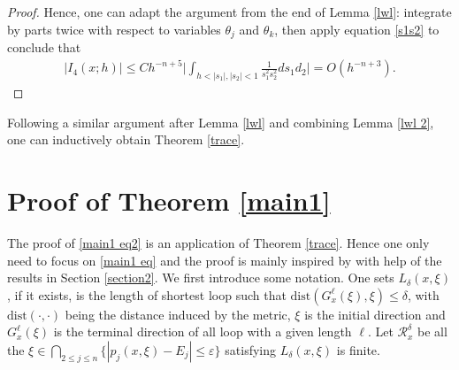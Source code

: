 \documentclass[12pt,reqno]{amsart}
\renewcommand{\epsilon}{\varepsilon}
\numberwithin{equation}{section}
\begin{document}
\begin{proof}
Hence, one can adapt the argument from the end of Lemma \ref{lwl}: integrate by parts twice with respect to variables $\theta_j$ and $\theta_k$, then apply equation \eqref{s1s2} to conclude that
\begin{align}\label{last2'}
\Big| {I}_4 (x; h) \Big| \leq C h^{-n+5}  \Big|\int_{h<|s_1|,|s_2|<1}\frac{1}{s^2_1 s^2_2}  ds_1 d_2 \Big|=O(h^{-n+3}) .
\end{align}



\end{proof}

Following a similar argument after Lemma \ref{lwl} and combining Lemma \ref{lwl 2}, one can inductively obtain Theorem \ref{trace}.

\bigskip


\section{Proof of Theorem \ref{main1}}\label{section3}
The proof of \eqref{main1 eq2} is an application of Theorem \ref{trace}. Hence one only need to focus on \eqref{main1 eq} and the proof is mainly inspired by \cite{STZ11} with help of the results in Section \ref{section2}. We first introduce some notation. One sets $L_\delta(x,\xi)$, if it exists, is the length of shortest loop such that $\text{dist}(G^{\ell}_x(\xi),\xi)\leq \delta$, with $\text{dist}(\cdot, \cdot)$ being the distance induced by the metric, $\xi$ is the initial direction and $G^{\ell}_x(\xi)$ is the terminal direction of all loop with a given length $\ell$. Let $\mathcal{R}_x^\delta$ be all the $\xi\in \bigcap\limits_{2\leq j \leq n}\{|p_j(x,\xi)-E_j|\leq \epsilon\}$ satisfying $L_\delta(x,\xi)$ is finite.
\end{document}
